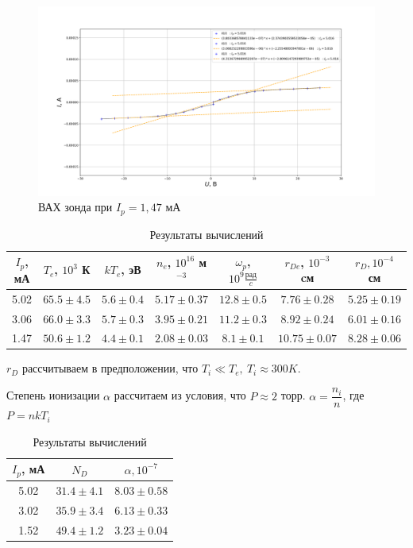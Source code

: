\documentclass{lab}
\begin{document}
\begin{figure}[H]
    \centering
    \includegraphics[width = \textwidth]{graph5.png}
    \caption{ВАХ зонда при $I_p = 1,47$ мА}
\end{figure}
\begin{table}[H]
    \centering
    \begin{tabular}{|c|c|c|c|c|c|c|}
        \hline
        $I_p$, мА  & $T_e$, $10^3$ К & $kT_e$, эВ & $n_e$, $10^{16}$ м$^{-3}$ & $\omega_p$, $10^9 \frac{\text{рад}}{c}$ & $r_{De}$, $10^{-3}$ cм & $r_D, 10^{-4}$ см  \\ \hline
        5.02   & $65.5\pm 4.5$ & $5.6 \pm 0.4$ & $5.17 \pm 0.37$                     & $12.8\pm 0.5$                   & $7.76\pm 0.28$    &   $5.25 \pm 0.19$            \\ \hline
        3.06   & $66.0\pm 3.3$ & $5.7 \pm 0.3$ & $3.95\pm 0.21$                     & $11.2\pm 0.3$                    & $8.92\pm 0.24$    &  $6.01 \pm 0.16$               \\ \hline
        1.47   & $50.6\pm 1.2$ & $4.4 \pm 0.1$ & $2.08\pm 0.03$                    & $8.1\pm 0.1$                     & $10.75 \pm 0.07$  &  $8.28 \pm 0.06$                 \\ \hline
    \end{tabular}
    \caption{Результаты вычислений}
\end{table}

$r_D$ рассчитываем в предположении, что $T_i \ll T_e, \ T_i \approx 300 K$.

Степень ионизации $\alpha$ рассчитаем из условия, что $P \approx 2$ торр. $\alpha = \dfrac{n_i}{n}$, где $P = nkT_i$
\begin{table}[H]
    \centering
    \begin{tabular}{|c|c|c|}
        \hline
        $I_p$, мА & $N_D$ & $\alpha, 10^{-7}$ \\ \hline
        5.02 & $31.4 \pm 4.1 $ & $8.03 \pm 0.58$ \\ \hline
        3.02 & $35.9 \pm 3.4$ & $6.13 \pm 0.33$ \\ \hline
        1.52 & $49.4 \pm 1.2$ & $3.23 \pm 0.04$ \\ \hline
    \end{tabular}
    \caption{Результаты вычислений}
\end{table}
\end{document}
